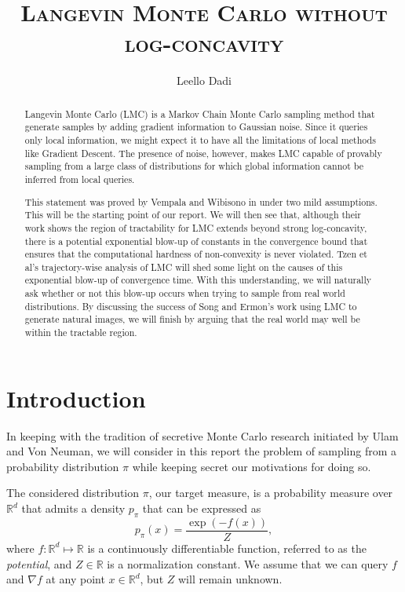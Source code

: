 \documentclass[11pt,twoside]{article}
\title{\textsc{Langevin Monte Carlo without log-concavity}}
\author{Leello Dadi}
\date{}
\theoremstyle{definition}
\newcommand{\R}{\mathbb{R}}
\begin{document}
\maketitle

\begin{abstract}
    Langevin Monte Carlo (LMC) is a Markov Chain Monte Carlo sampling method that generate samples by adding gradient information to Gaussian noise. Since it queries only local information, we might expect it to have all the limitations of local methods like Gradient Descent. The presence of noise, however, makes LMC capable of provably sampling from a large class of distributions for which global information cannot be inferred from local queries. 
    
    This statement was proved by Vempala and Wibisono in \cite{vempala_rapid_2019} under two mild assumptions. This will be the starting point of our report. We will then see that, although their work shows the region of tractability for LMC extends beyond strong log-concavity, there is a potential exponential blow-up of constants in the convergence bound that ensures that the computational hardness of non-convexity is never violated. Tzen et al's trajectory-wise analysis of LMC \cite{tzen_local_2018} will shed some light on the causes of this exponential blow-up of convergence time. With this understanding, we will naturally ask whether or not this blow-up occurs when trying to sample from real world distributions. By discussing the success of Song and Ermon's work \cite{song_generative_2019} using LMC to generate natural images, we will finish by arguing that the real world may well be within the tractable region.
\end{abstract}

\section{Introduction}

In keeping with the tradition of secretive Monte Carlo research initiated by Ulam and Von Neuman, we will consider in this report the problem of sampling from a probability distribution $\pi$ while keeping secret our motivations for doing so. 

The considered distribution $\pi$, our target measure, is a probability measure over $\R^d$ that admits a density $p_\pi$ that can be expressed as
\[
p_\pi(x) = \frac{\exp{\left(-f(x)\right)}}{Z},
\]
where $f: \R^d \mapsto \R$ is a continuously differentiable function, referred to as the \textit{potential}, and $Z \in \R$ is a normalization constant. We assume that we can query $f$ and $\nabla f$ at any point $x \in \R^d$, but $Z$ will remain unknown.
\end{document}

